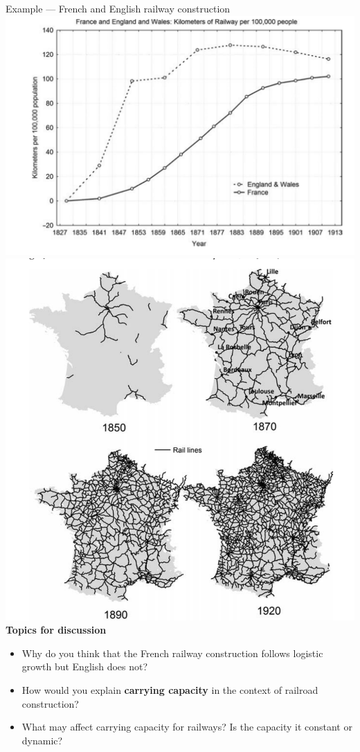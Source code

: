\begin{frame}{Example --- French and English railway construction}
\small
    \includegraphics[scale = 0.3]{lesson_1/images/logistic_model_railroad_curve.png}
    \includegraphics[scale = 0.2]{lesson_1/images/logistic_model_railroad.png}
    \pause
\textbf{Topics for discussion}
    \begin{itemize}
        \item Why do you think that the French railway construction follows logistic growth but English does not? 
        \pause
        \item How would you explain \textbf{carrying capacity} in the context of railroad construction?
        \pause
        \item What may affect carrying capacity for railways? Is the capacity it constant or dynamic? 
    \end{itemize}
\end{frame}


